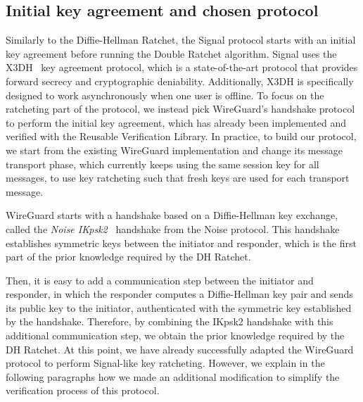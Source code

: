 \subsection{Initial key agreement and chosen protocol}
\label{sec:chosen-protocol}

Similarly to the Diffie-Hellman Ratchet, the Signal protocol starts with an initial key agreement before running the Double Ratchet algorithm.
Signal uses the X3DH~\cite{marlinspike2016x3dh} key agreement protocol, which is a state-of-the-art protocol that provides forward secrecy and cryptographic deniability.
Additionally, X3DH is specifically designed to work asynchronously when one user is offline.
To focus on the ratcheting part of the protocol, we instead pick WireGuard's handshake protocol to perform the initial key agreement, which has already been implemented and verified with the Reusable Verification Library.
In practice, to build our protocol, we start from the existing WireGuard implementation and change its message transport phase, which currently keeps using the same session key for all messages, to use key ratcheting such that fresh keys are used for each transport message.

WireGuard starts with a handshake based on a Diffie-Hellman key exchange, called the \emph{Noise IKpsk2}~\cite{perrin2018noise} handshake from the Noise protocol. This handshake establishes symmetric keys between the initiator and responder, which is the first part of the prior knowledge required by the DH Ratchet.

Then, it is easy to add a communication step between the initiator and responder, in which the responder computes a Diffie-Hellman key pair and sends its public key to the initiator, authenticated with the symmetric key established by the handshake.
Therefore, by combining the IKpsk2 handshake with this additional communication step, we obtain the prior knowledge required by the DH Ratchet.
At this point, we have already successfully adapted the WireGuard protocol to perform Signal-like key ratcheting.
However, we explain in the following paragraphs how we made an additional modification to simplify the verification process of this protocol.

